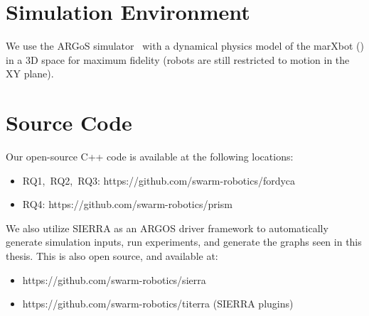 \section{Simulation Environment}\label{foraging-context:sec:sim-env}
%
We use the ARGoS simulator~\cite{Pinciroli2012} with a dynamical physics model
of the marXbot (\cite{Dorigo2005c}) in a 3D space for maximum fidelity (robots
are still restricted to motion in the XY plane).


\section{Source Code}\label{foraging-context:sec:source-code}

Our open-source C++ code is available at the following locations:
%
\begin{itemize}
\item {\gls{RQ1},~\gls{RQ2},~\gls{RQ3}:
    https://github.com/swarm-robotics/fordyca }
\item {\gls{RQ4}: https://github.com/swarm-robotics/prism}
\end{itemize}
%
We also utilize SIERRA as an ARGOS driver framework to automatically generate
simulation inputs, run experiments, and generate the graphs seen in this thesis.
This is also open source, and available at:
%
\begin{itemize}
  \item {https://github.com/swarm-robotics/sierra}
  \item {https://github.com/swarm-robotics/titerra (SIERRA plugins)}
\end{itemize}

